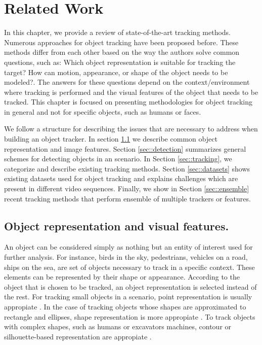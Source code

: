 \chapter{Related Work} %

\label{chapter::related_work} %


In this chapter, we provide a review of state-of-the-art tracking methods.
Numerous approaches for object tracking have been proposed before. These methods
differ from each other based on the way the authors solve common questions, such
as: Which object representation is suitable for tracking the target? How can
motion, appearance, or shape of the object needs to be modeled?. The answers 
for these questions depend on the context/environment where tracking is
performed and the visual features of the object that needs to be tracked. This
chapter is focused on presenting methodologies for object tracking in general
and not for specific objects, such as humans or faces.

We follow a structure for describing the issues that are necessary to address
when building an object tracker. In section \ref{sec::object_representation} we
describe common object representation and image features. Section
\ref{sec::detection} summarizes general schemes for detecting objects in an
scenario. In Section \ref{sec::tracking}, we categorize and describe
existing tracking methods. Section \ref{sec::datasets} shows existing
datasets used for object tracking and explains challenges which are present
in different video sequences. Finally, we show in Section \ref{sec::ensemble}
recent tracking methods that perform ensemble of multiple trackers or features.

\section{Object representation and visual features.}
\label{sec::object_representation}

An object can be considered simply as nothing but an entity of interest used for
further analysis. For instance, birds in the sky, pedestrians, vehicles on a
road, ships on the sea, are set of objects necessary to track in a specific
context. These elements can be represented by their shape or appearance.
According to the object that is chosen to be tracked, an object representation
is selected instead of the rest. For tracking small objects
in a scenario, point representation is usually appropiate
\cite{Veenman2001,Shafique2005}. In the case of tracking objects whose shapes
are approximated to rectangle and ellipses, shape representation is more
appropiate \cite{Comaniciu2003a}. To track objects with complex shapes, such
as humans or excavators machines, contour or silhouette-based representation are
appropiate \cite{Haritaoglu2000}.

